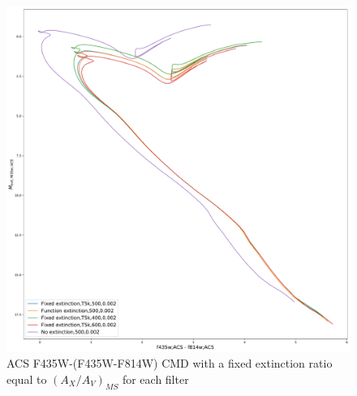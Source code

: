 \documentclass[12pt, a4paper]{report}
\begin{document}
\begin{figure}[h!]
\begin{center}
\includegraphics[width=1.0\textwidth]{../basti_isochrones_10_13Gyr/Extinction_T5k_FeH0fix_func_f435wACS_f435wACSmf814wACS_500_400_600_Myr_FeH_0p002_ref_noext_Av_1p0.pdf}
\caption{ACS F435W-(F435W-F814W) CMD with a fixed extinction ratio equal to $(A_{X}/A_{V})_{MS}$ for each filter}
\label{acs_isoc_T5k}
\end{center}
\end{figure}
\end{document}
